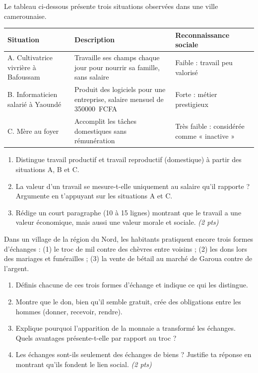 \documentclass[11pt]{article}
\begin{document}
\begin{exercice}
Le tableau ci-dessous présente trois situations observées dans une ville camerounaise.

\begin{center}
\begin{tabular}{|p{4cm}|p{5cm}|p{5cm}|}
\hline
\textbf{Situation} & \textbf{Description} & \textbf{Reconnaissance sociale} \\
\hline
A. Cultivatrice vivrière à Bafoussam & Travaille ses champs chaque jour pour nourrir sa famille, sans salaire & Faible : travail peu valorisé \\
\hline
B. Informaticien salarié à Yaoundé & Produit des logiciels pour une entreprise, salaire mensuel de \SI{350000}{FCFA} & Forte : métier prestigieux \\
\hline
C. Mère au foyer & Accomplit les tâches domestiques sans rémunération & Très faible : considérée comme « inactive » \\
\hline
\end{tabular}
\end{center}

\begin{enumerate}
\item Distingue travail productif et travail reproductif (domestique) à partir des situations A, B et C.
\item La valeur d'un travail se mesure-t-elle uniquement au salaire qu'il rapporte ? Argumente en t'appuyant sur les situations A et C.
\item Rédige un court paragraphe (10 à 15 lignes) montrant que le travail a une valeur économique, mais aussi une valeur morale et sociale. \textit{(2 pts)}
\end{enumerate}
\end{exercice}

\begin{exercice}
Dans un village de la région du Nord, les habitants pratiquent encore trois formes d'échanges : (1) le troc de mil contre des chèvres entre voisins ; (2) les dons lors des mariages et funérailles ; (3) la vente de bétail au marché de Garoua contre de l'argent.
\begin{enumerate}
\item Définis chacune de ces trois formes d'échange et indique ce qui les distingue.
\item Montre que le don, bien qu'il semble gratuit, crée des obligations entre les hommes (donner, recevoir, rendre).
\item Explique pourquoi l'apparition de la monnaie a transformé les échanges. Quels avantages présente-t-elle par rapport au troc ?
\item Les échanges sont-ils seulement des échanges de biens ? Justifie ta réponse en montrant qu'ils fondent le lien social. \textit{(2 pts)}
\end{enumerate}
\end{exercice}
\end{document}
